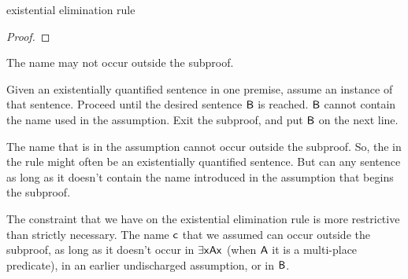	\begin{quote}
	\end{quote}

\begin{factboxy}{existential elimination rule}
\begin{proof}
	\open
		 \as{}
	\close
	 
\end{proof}

\small{The name  may not occur outside the subproof.\smallskip

Given an existentially quantified sentence in one premise, assume an instance of that sentence. Proceed until the desired sentence $\mathsf{B}$ is reached. $\mathsf{B}$ cannot contain the name used in the assumption. Exit the subproof, and put $\mathsf{B}$ on the next line.
}
\end{factboxy}

The name that is in the assumption cannot occur outside the subproof. So, the  in the rule might often be an existentially quantified sentence. But  can any sentence as long as it doesn't contain the name introduced in the assumption that begins the subproof.


\begin{notebox}
The constraint that we have on the existential elimination rule is more restrictive than strictly necessary. The name $\mathsf{c}$ that we assumed can occur outside the subproof, as long as it doesn't occur in $\exists \mathsf{x}\mathsf{Ax}$ (when $\mathsf{A}$ it is a multi-place predicate), in an earlier undischarged assumption, or in $\mathsf{B}$.
\end{notebox}

